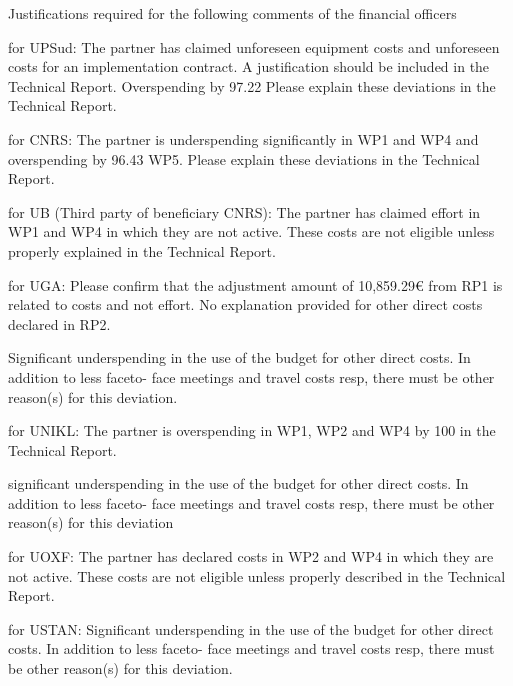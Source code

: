 
Justifications required for the following comments of the financial officers 

for UPSud:
The partner has claimed unforeseen equipment costs and unforeseen costs for an
implementation contract. A justification should be included in the Technical Report.
Overspending by 97.22%
Please explain these deviations in the Technical Report.

for CNRS:
The partner is underspending significantly in WP1 and WP4 and overspending by 96.43%
WP5. Please explain these deviations in the Technical Report.

for UB (Third party of beneficiary CNRS):
The partner has claimed effort in WP1 and WP4 in which they are not active. These costs are
not eligible unless properly explained in the Technical Report.

for UGA: 
Please confirm that the adjustment amount of 10,859.29€ from RP1 is related to costs and not
effort. No explanation provided for other direct costs declared in RP2.

Significant underspending in the use of the budget for other direct costs. In addition to less faceto-
face meetings and travel costs resp, there must be other reason(s) for this deviation.

for UNIKL:
The partner is overspending in WP1, WP2 and WP4 by 100%
in the Technical Report.

significant underspending in the use of the budget for other direct costs. In addition to less faceto-
face meetings and travel costs resp, there must be other reason(s) for this deviation

for UOXF:
The partner has declared costs in WP2 and WP4 in which they are not active. These costs are
not eligible unless properly described in the Technical Report.


for USTAN:
Significant underspending in the use of the budget for other direct costs. In addition to less faceto-
face meetings and travel costs resp, there must be other reason(s) for this deviation.


